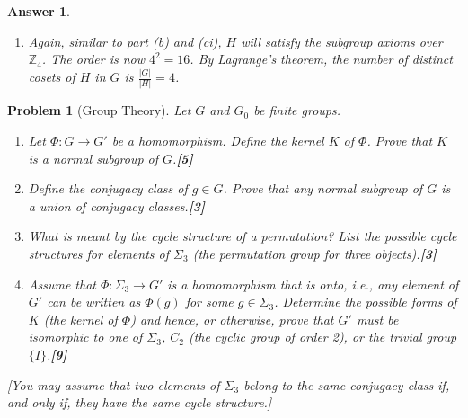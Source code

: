 \documentclass[a4paper]{article}
\newtheorem{ans}{Answer}[section]
\theoremstyle{new}
\newtheorem{qns}{Problem}[section]
\begin{document}
\begin{ans}
\begin{enumerate}[label=(\alph*)]
\begin{enumerate}[label=(\roman*)]
\begin{itemize}
    \item inverse: when $x+x'=0$, $y'+xz'+y=0$ and $z+z'=0$, we can find solutions $x',y',z'\in\mathbb{Z}_4$, so we have an inverse.
\end{itemize}
There are 4 possibilities for $x,y,z$ and so $4^3$ distinct matrices. The order of $G$ is $4^3=64$.
\item Again, similar to part (b) and (ci), $H$ will satisfy the subgroup axioms over $\mathbb{Z}_4$. The order is now $4^2=16$. By Lagrange's theorem, the number of distinct cosets of $H$ in $G$ is $\frac{|G|}{|H|}=4$.
\end{enumerate}
\end{enumerate}
\end{ans}
\begin{qns}[Group Theory]
Let $G$ and $G_0$ be finite groups.
\begin{enumerate}[label=(\alph*)]
\item Let $\Phi:G\rightarrow G'$ be a homomorphism. Define the kernel $K$ of $\Phi$. Prove that $K$ is a normal subgroup of $G$.\hfill\textbf{[5]}
\item Define the conjugacy class of $g\in G$. Prove that any normal subgroup of $G$ is a union of conjugacy classes.\hfill\textbf{[3]}
\item What is meant by the cycle structure of a permutation? List the possible cycle structures for elements of $\Sigma_3$ (the permutation group for three objects).\hfill\textbf{[3]}
\item Assume that $\Phi:\Sigma_3\rightarrow G'$ is a homomorphism that is onto, i.e., any element of $G'$ can be written as $\Phi(g)$ for some $g\in\Sigma_3$. Determine the possible forms of $K$ (the kernel of $\Phi$) and hence, or otherwise, prove that $G'$ must be isomorphic to one of $\Sigma_3$, $C_2$ (the cyclic group of order 2), or the trivial group $\{I\}$.\hfill\textbf{[9]}
\end{enumerate}
[You may assume that two elements of $\Sigma_3$ belong to the same conjugacy class if, and only if, they have the same cycle structure.]
\end{qns}
\end{document}
